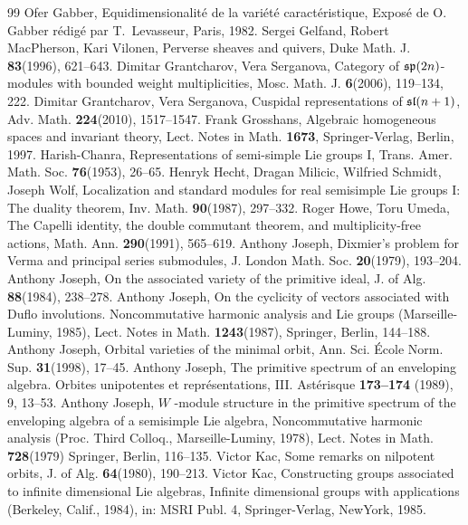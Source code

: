 \documentclass[12pt]{amsart}
\theoremstyle{definition}\newtheorem{theorem}{Theorem}[section]
\theoremstyle{definition}\newtheorem{definition}[proposition]{Definition}
\theoremstyle{remark}\newtheorem{example}[proposition]{Example}
\begin{document}
\begin{thebibliography}{99}
 Ofer Gabber, Equidimensionalit\'e de la vari\'et\'e caract\'eristique, Expos\'e de O. Gabber r\'edig\'e par T.~Levasseur, Paris, 1982.
 Sergei Gelfand, Robert MacPherson, Kari Vilonen, Perverse sheaves and quivers, Duke Math. J. {\bf83}(1996), 621--643.
 Dimitar Grantcharov, Vera Serganova, Category of $\frak{sp}(2n)$-modules with bounded weight multiplicities, Mosc. Math. J. {\bf6}(2006), 119--134, 222.
 Dimitar Grantcharov, Vera Serganova, Cuspidal representations of $\frak{sl}(n+1)$, Adv. Math.  {\bf224}(2010), 1517--1547.
 Frank Grosshans, Algebraic homogeneous spaces and invariant theory, Lect. Notes in Math. {\bf1673}, Springer-Verlag, Berlin, 1997.
 Harish-Chanra, Representations of semi-simple Lie groups I, Trans. Amer. Math. Soc. {\bf76}(1953), 26--65.
 Henryk Hecht, Dragan Milicic, Wilfried Schmidt, Joseph Wolf, Localization and standard modules for real semisimple Lie groups I: The duality theorem, Inv. Math. {\bf90}(1987), 297--332.
 Roger Howe, Toru Umeda, The Capelli identity, the double commutant theorem, and multiplicity-free actions, Math. Ann. {\bf290}(1991), 565--619.
 Anthony Joseph, Dixmier's problem for Verma and principal series submodules,  J. London Math. Soc. {\bf20}(1979), 193--204.
 Anthony Joseph, On the associated variety of the primitive ideal, J. of Alg. {\bf88}(1984), 238--278.
 Anthony Joseph, On the cyclicity of vectors associated with Duflo involutions. Noncommutative harmonic analysis and Lie groups (Marseille-Luminy, 1985), Lect. Notes in Math. {\bf1243}(1987), Springer, Berlin, 144--188.
 Anthony Joseph, Orbital varieties of the minimal orbit, Ann. Sci. \'Ecole Norm. Sup. {\bf31}(1998), 17--45.
 Anthony Joseph, The primitive spectrum of an enveloping algebra. Orbites unipotentes et repr\'esentations, III. Ast\'erisque {\bf173--174} (1989), 9, 13--53.
 Anthony Joseph, $W$ -module structure in the primitive spectrum of the enveloping algebra of a semisimple Lie algebra, Noncommutative harmonic analysis (Proc. Third Colloq., Marseille-Luminy, 1978), Lect. Notes in Math. {\bf728}(1979) Springer, Berlin, 116--135.
 Victor Kac, Some remarks on nilpotent orbits, J. of Alg. {\bf64}(1980), 190--213.
 Victor Kac, Constructing groups associated to infinite dimensional Lie algebras, Infinite dimensional groups with applications (Berkeley, Calif., 1984), in: MSRI Publ. 4, Springer-Verlag, NewYork, 1985.

\end{thebibliography}
\end{document}
